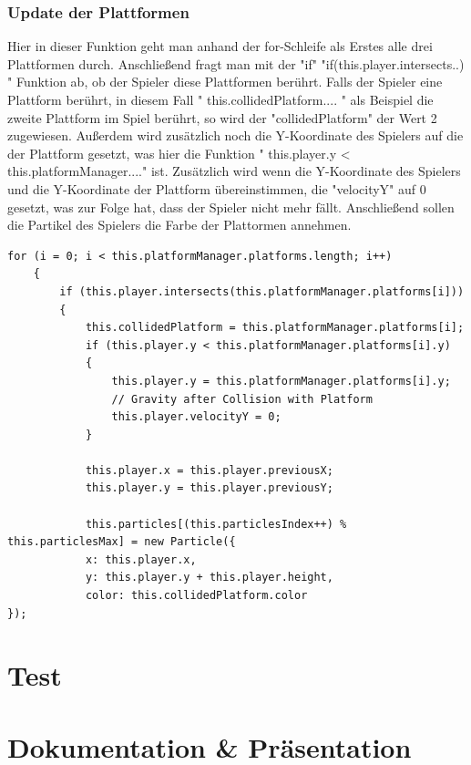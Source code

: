 \subsubsection{Update der Plattformen}
Hier in dieser Funktion geht man anhand der for-Schleife als Erstes alle drei Plattformen durch. Anschließend fragt man mit der "if" "if(this.player.intersects..) " Funktion ab, ob der Spieler diese Plattformen ber\"uhrt. Falls der Spieler eine Plattform ber\"uhrt, in diesem Fall " this.collidedPlatform.... " als Beispiel die zweite Plattform im Spiel ber\"uhrt, so wird der "collidedPlatform" der Wert 2 zugewiesen. Außerdem wird zus\"atzlich noch die Y-Koordinate des Spielers auf die der Plattform gesetzt, was hier die Funktion " this.player.y < this.platformManager...." ist. Zus\"atzlich wird wenn die Y-Koordinate des Spielers und die Y-Koordinate der Plattform \"ubereinstimmen, die "velocityY" auf 0 gesetzt, was zur Folge hat, dass der Spieler nicht mehr f\"allt. Anschließend sollen die Partikel des Spielers die Farbe der Plattormen annehmen.
\lstset{language=java}
\begin{lstlisting}[frame=single]
    for (i = 0; i < this.platformManager.platforms.length; i++) 
    {
		if (this.player.intersects(this.platformManager.platforms[i])) 
		{
			this.collidedPlatform = this.platformManager.platforms[i];
			if (this.player.y < this.platformManager.platforms[i].y) 
			{
				this.player.y = this.platformManager.platforms[i].y;
				// Gravity after Collision with Platform
				this.player.velocityY = 0;
			}

			this.player.x = this.player.previousX;
			this.player.y = this.player.previousY;
			
			this.particles[(this.particlesIndex++) % this.particlesMax] = new Particle({
			x: this.player.x,
			y: this.player.y + this.player.height,
			color: this.collidedPlatform.color
});
\end{lstlisting}
\section{Test}
\section{Dokumentation \& Pr\"asentation}

